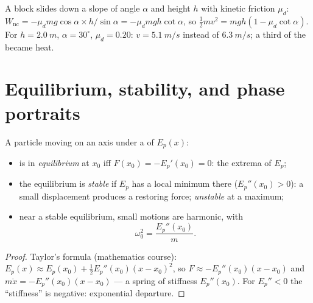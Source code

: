 \begin{example}\label{ex:b1:work-and-energy:friction}
A block slides down a slope of angle $\alpha$ and height $h$ with
kinetic friction $\mu_d$: $W_{\text{nc}} = -\mu_dmg\cos\alpha \times
h/\sin\alpha = -\mu_dmgh\cot\alpha$, so $\tfrac12 mv^2 = mgh(1 - \mu_d\cot\alpha)$.
For $h = \qty{2.0}{m}$, $\alpha = 30^\circ$, $\mu_d = 0.20$: $v =
\qty{5.1}{m/s}$ instead of $\qty{6.3}{m/s}$; a third of the  became heat.
\end{example}

\section{Equilibrium, stability, and phase portraits}

\begin{proposition}\label{prop:b1:work-and-energy:stability}
A particle moving on an axis under a  of  $E_p(x)$:
\begin{itemize}
  \item is in \emph{equilibrium} at $x_0$ iff $F(x_0) = -E_p'(x_0) = 0$:
        the extrema of $E_p$;
  \item the equilibrium is \emph{stable} if $E_p$ has a local minimum
        there ($E_p''(x_0) > 0$): a small displacement produces a
        restoring force; \emph{unstable} at a maximum;
  \item near a stable equilibrium, small motions are harmonic, with
        \[
        \omega_0^2 = \frac{E_p''(x_0)}{m} .
        \]
\end{itemize}
\end{proposition}

\begin{proof}
Taylor's formula (mathematics course): $E_p(x) \approx E_p(x_0) +
\tfrac12 E_p''(x_0)(x - x_0)^2$, so $F \approx -E_p''(x_0)(x - x_0)$ and
$m\ddot x = -E_p''(x_0)(x - x_0)$ --- a spring of stiffness $E_p''(x_0)$.
For $E_p'' < 0$ the ``stiffness'' is negative: exponential departure.
\end{proof}


